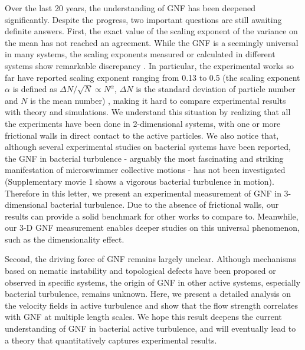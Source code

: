 \documentclass[twocolumn,aps,prl,amsmath,amssymb,longbibliography]{revtex4-2}
\begin{document}
Over the last 20 years, the understanding of GNF has been deepened significantly. Despite the progress, two important questions are still awaiting definite answers.
First, the exact value of the scaling exponent of the variance on the mean has not reached an agreement. While the GNF is a seemingly universal in many systems, the scaling exponents measured or calculated in different systems show remarkable discrepancy \cite{AditiSimha2002, Ramaswamy2003, Narayan2007, Chate2008, Deseigne2010, Zhang2010,
Dey2012, Saintillan2012, Schaller2013, Ngo2014, Nishiguchi2017, Kawaguchi2017, Mahault2019,
Karani2019}. In particular, the experimental works so far have reported scaling exponent ranging from 0.13 to 0.5 (the scaling exponent $\alpha$ is defined as $\Delta N /\sqrt N \propto N^\alpha$, $\Delta N$ is the standard deviation of particle number and $N$ is the mean number)
\cite{Narayan2007, Deseigne2010, Zhang2010, Schaller2013, Nishiguchi2017, Kawaguchi2017, Karani2019}, making it hard to compare experimental results with theory and simulations. We understand this situation by realizing that all the experiments have been done in 2-dimensional systems, with one or more frictional walls in direct contact to the active particles. We also notice that, although several experimental studies on bacterial systems have been reported, the GNF in bacterial turbulence - arguably the most fascinating and striking manifestation of microswimmer collective motions - has not been investigated (Supplementary movie 1 shows a vigorous bacterial turbulence in motion). Therefore in this letter, we present an experimental measurement of GNF in 3-dimensional bacterial turbulence. Due to the absence of frictional walls, our results can provide a solid benchmark for other works to compare to. Meanwhile, our 3-D GNF measurement enables deeper studies on this universal phenomenon, such as the dimensionality effect.

Second, the driving force of GNF remains largely unclear. Although mechanisms based on nematic instability \cite{AditiSimha2002, Ramaswamy2003, Narayan2007} and topological defects \cite{Saintillan2008b, Schaller2013} have been proposed or observed in specific systems, the origin of GNF in other active systems, especially bacterial turbulence, remains unknown. Here, we present a detailed analysis on the velocity fields in active turbulence and show that the flow strength correlates with GNF at multiple length scales. We hope this result deepens the current understanding of GNF in bacterial active turbulence, and will eventually lead to a theory that quantitatively captures experimental results.
\end{document}
